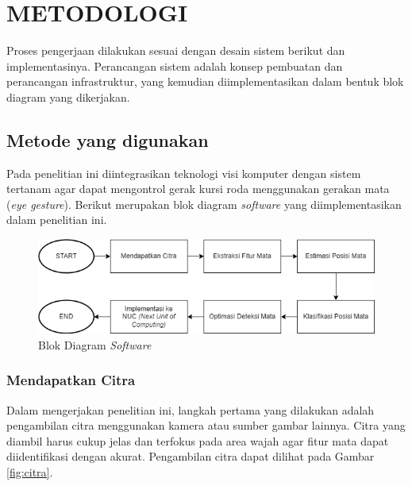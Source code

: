 \chapter{METODOLOGI}
\label{chap:metodologi}


Proses pengerjaan dilakukan sesuai dengan desain sistem berikut dan implementasinya. Perancangan sistem adalah konsep pembuatan dan perancangan infrastruktur, yang kemudian diimplementasikan dalam bentuk blok diagram yang dikerjakan.

\section{Metode yang digunakan}
\label{sec:deskripsisistem}
Pada penelitian ini diintegrasikan teknologi visi komputer dengan sistem tertanam agar dapat mengontrol gerak kursi roda menggunakan gerakan mata (\emph{eye gesture}). Berikut merupakan blok diagram \emph{software} yang diimplementasikan dalam penelitian ini.

\begin{figure} [ht] \centering
  \includegraphics[scale=0.7]{gambar/bab3/software.png}
  \caption{Blok Diagram \textit{Software}}
  \label{fig:software}
\end{figure}

\subsection{Mendapatkan Citra}

Dalam mengerjakan penelitian ini, langkah pertama yang dilakukan adalah pengambilan citra menggunakan kamera atau sumber gambar lainnya. Citra yang diambil harus cukup jelas dan terfokus pada area wajah agar fitur mata dapat diidentifikasi dengan akurat. Pengambilan citra dapat dilihat pada Gambar \ref{fig:citra}.\\

